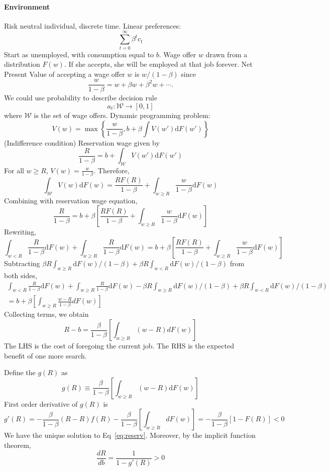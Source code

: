\documentclass[11pt,a4paper]{article}
\begin{document}
\paragraph{Environment}
Risk neutral individual, discrete time. Linear preferences: $$ \sum_{t=0}^\infty \beta^t c_t $$
Start as unemployed, with consumption equal to $b$. Wage offer $w$ drawn from a distribution $F(w)$. If she accepts, she will be employed at that job forever. Net Present Value of accepting a wage offer $w$ is $w/(1-\beta)$ since $$\frac{w}{1-\beta} = w + \beta w +\beta^2 w + \cdots.$$
We could use probability to describe decision rule $$ a_t : \mathcal{W}\to [0,1] $$ where $\mathcal{W}$ is the set of wage offers.
Dynamic programming problem: $$ V(w) = \max \left\{ \frac{w}{1-\beta}, b + \beta \int V(w') \mathrm{d}F(w') \right\} $$ 
(Indifference condition)
Reservation wage given by $$ \frac{R}{1-\beta} =  b+\int_{\mathcal{W}} V(w')\mathrm{d}F(w') $$
For all $w\geq R$, $V(w) = \frac{w}{1-\beta}$.
Therefore, $$ \int_{\mathcal{W}}V(w)\mathrm{d}F(w) = \frac{R F(R)}{1-\beta} +\int_{w\geq R}\frac{w}{1-\beta} \mathrm{d}F(w) $$
Combining with reservation wage equation, $$ \frac{R}{1-\beta} = b +\beta \left[\frac{R F(R)}{1-\beta} +\int_{w\geq R} \frac{w}{1-\beta}\mathrm{d}F(w)\right] $$
Rewriting, $$ \int_{w<R} \frac{R}{1-\beta} \mathrm{d}F(w) + \int_{w\geq R}\frac{R}{1-\beta}\mathrm{d}F(w) = b +\beta \left[\frac{R F(R)}{1-\beta} +\int_{w\geq R} \frac{w}{1-\beta}\mathrm{d}F(w)\right] $$
Subtracting $\beta R \int_{w\geq R} \mathrm{d}F(w)/(1-\beta)+\beta R \int_{w< R} \mathrm{d}F(w)/(1-\beta)$ from both sides,
$$ \begin{aligned}
    \int_{w<R} \frac{R}{1-\beta} \mathrm{d}F(w) + \int_{w\geq R}\frac{R}{1-\beta}\mathrm{d}F(w)-\beta R \int_{w\geq R} \mathrm{d}F(w)/(1-\beta)+\beta R \int_{w< R} \mathrm{d}F(w)/(1-\beta)\\ =  b+\beta\left[\int_{w\geq R}\frac{w-R}{1-\beta}d F(w)\right] 
\end{aligned}$$
Collecting terms, we obtain
\begin{equation}
    R- b = \frac{\beta}{1-\beta}\left[\int_{w\geq R}(w-R)d F(w)\right] \label{eq:reserv}
\end{equation}
The LHS is the cost of foregoing the current job. 
The RHS is the expected benefit of one more search.

Define the $g(R)$ as $$ g(R)\equiv \frac{\beta}{1-\beta}\left[\int_{w\geq R}(w-R)\mathrm{d}F(w)\right] $$
First order derivative of $g(R)$ is $$ g'(R) = -\frac{\beta}{1-\beta}(R-R)f(R)-\frac{\beta}{1-\beta}\left[\int_{w\geq R}dF(w)\right]= -\frac{\beta}{1-\beta}[1-F(R)]<0 $$ We have the unique solution to Eq~\eqref{eq:reserv}. 
Moreover, by the implicit function theorem, $$ \frac{dR}{db}= \frac{1}{1-g'(R)}>0 $$
\end{document}
